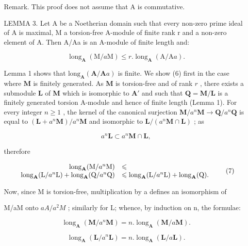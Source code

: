 Remark. This proof does not assume that A is commutative.

LEMMA 3. Let A be a Noetherian domain such that every non-zero prime ideal of A is maximal, M a torsion-free A-module of finite rank r and a non-zero element of A. Then A/Aa is an A-module of finite length and:

\[
\operatorname{long} _ {\mathbf {A}} (\mathrm{M} / a \mathrm{M}) \leqslant r. \operatorname{long} _ {\mathbf {A}} (\mathrm{A} / \mathrm{A} a).\tag{6}
\]

Lemma 1 shows that \(\mathrm{long}_{\mathbf{A}}(\mathbf{A} / \mathbf{A}a)\) is finite. We show (6) first in the case where \(\mathbf{M}\) is finitely generated. As \(\mathbf{M}\) is torsion-free and of rank \(r\) , there exists a submodule \(\mathbf{L}\) of \(\mathbf{M}\) which is isomorphic to \(\mathbf{A}'\) and such that \(\mathbf{Q} = \mathbf{M} / \mathbf{L}\) is a finitely generated torsion A-module and hence of finite length (Lemma 1). For every integer \(n \geqslant 1\) , the kernel of the canonical surjection \(\mathbf{M} / a^n\mathbf{M} \to \mathbf{Q} / a^n\mathbf{Q}\) is equal to \((\mathbf{L} + a^n\mathbf{M}) / a^n\mathbf{M}\) and isomorphic to \(\mathbf{L} / (a^n\mathbf{M} \cap \mathbf{L})\) ; as

\[
a ^ {n} \mathbf {L} \subset a ^ {n} \mathbf {M} \cap \mathbf {L},
\]

therefore

\[
\begin{array}{r l} \operatorname{long} _ {\mathbf {A}} (\mathrm{M} / a ^ {n} \mathrm{M}) & \leqslant \\ \operatorname{long} _ {\mathbf {A}} (\mathrm{L} / a ^ {n} \mathrm{L}) + \operatorname{long} _ {\mathbf {A}} (\mathrm{Q} / a ^ {n} \mathrm{Q}) & \leqslant \operatorname{long} _ {\mathbf {A}} (\mathrm{L} / a ^ {n} \mathrm{L}) + \operatorname{long} _ {\mathbf {A}} (\mathrm{Q}). \end{array} \tag {7}
\]

Now, since M is torsion-free, multiplication by a defines an isomorphism of

M/aM onto \(aA/a^{2}M\) ; similarly for L; whence, by induction on n, the formulae:

\[
\operatorname{long} _ {\mathbf {A}} (\mathbf {M} / a ^ {n} \mathbf {M}) = n. \operatorname{long} _ {\mathbf {A}} (\mathbf {M} / a \mathbf {M}).\tag{8}
\]

\[
\operatorname{long} _ {\mathbf {A}} (\mathbf {L} / a ^ {n} \mathbf {L}) = n. \operatorname{long} _ {\mathbf {A}} (\mathbf {L} / a \mathbf {L}).
\]

